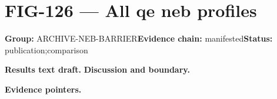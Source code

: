 \clearpage
\section{FIG-126 --- All qe neb profiles}
\label{figpage:fig-126}
\textbf{Group:} ARCHIVE-NEB-BARRIER\quad \textbf{Evidence chain:} manifested\quad \textbf{Status:} publication;comparison

\textbf{Results text draft.} 
\textbf{Discussion and boundary.} 


\textbf{Evidence pointers.}



\vfill
